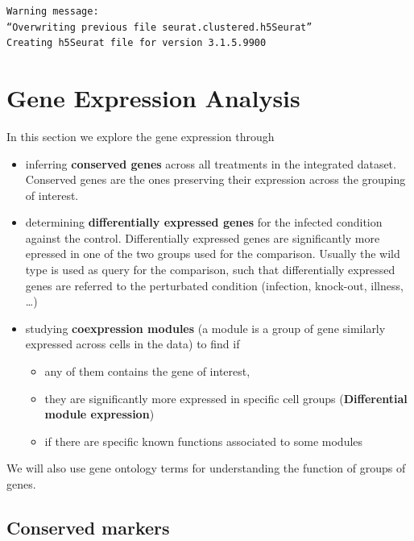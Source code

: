 \documentclass[
  letterpaper,
  DIV=11,
  numbers=noendperiod]{scrartcl}
\providecommand{\tightlist}{%
  \setlength{\itemsep}{0pt}\setlength{\parskip}{0pt}}\usepackage{longtable,booktabs,array}
\begin{document}
\begin{verbatim}
Warning message:
“Overwriting previous file seurat.clustered.h5Seurat”
Creating h5Seurat file for version 3.1.5.9900
\end{verbatim}

\hypertarget{sec-geneanalysis}{%
\section{Gene Expression Analysis}\label{sec-geneanalysis}}

In this section we explore the gene expression through

\begin{itemize}
\tightlist
\item
  inferring \textbf{conserved genes} across all treatments in the
  integrated dataset. Conserved genes are the ones preserving their
  expression across the grouping of interest.
\item
  determining \textbf{differentially expressed genes} for the infected
  condition against the control. Differentially expressed genes are
  significantly more epressed in one of the two groups used for the
  comparison. Usually the wild type is used as query for the comparison,
  such that differentially expressed genes are referred to the
  perturbated condition (infection, knock-out, illness, \ldots)
\item
  studying \textbf{coexpression modules} (a module is a group of gene
  similarly expressed across cells in the data) to find if

  \begin{itemize}
  \tightlist
  \item
    any of them contains the gene of interest,
  \item
    they are significantly more expressed in specific cell groups
    (\textbf{Differential module expression})
  \item
    if there are specific known functions associated to some modules
  \end{itemize}
\end{itemize}

We will also use gene ontology terms for understanding the function of
groups of genes.

\hypertarget{conserved-markers}{%
\subsection{Conserved markers}\label{conserved-markers}}
\end{document}
